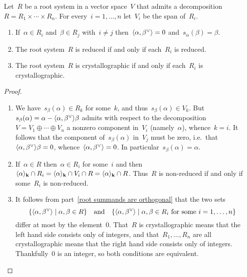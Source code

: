 \begin{proposition}
  \label{properties of decompositions}
  Let~$R$ be a root system in a vector space~$V$ that admits a decomposition~$R = R_1 \times \dotsb \times R_n$.
  For every~$i = 1, \dotsc, n$ let~$V_i$ be the span of~$R_i$.
  \begin{enumerate}
    \item
      \label{root summands are orthogonal}
      If~$\alpha \in R_i$ and~$\beta \in R_j$ with~$i \neq j$ then~$\pair{\alpha, \check{\beta}} = 0$ and~$s_\alpha(\beta) = \beta$.
    \item
      The root system~$R$ is reduced if and only if each~$R_i$ is reduced.
    \item
      The root system~$R$ is crystallographic if and only if each~$R_i$ is crystallographic.
  \end{enumerate}
\end{proposition}


\begin{proof}
  \leavevmode
  \begin{enumerate}
    \item
      We have~$s_\beta(\alpha) \in R_k$ for some~$k$, and thus~$s_\beta(\alpha) \in V_k$.
      But~$s_\beta(\alpha) = \alpha - \pair{\alpha, \check{\beta}} \beta$ admits with respect to the decomposition~$V = V_1 \oplus \dotsb \oplus V_n$ a nonzero component in~$V_i$ (namely~$\alpha$), whence~$k = i$.
      It follows that the component of~$s_\beta(\alpha)$ in~$V_j$ must be zero, i.e.\ that~$\pair{\alpha, \check{\beta}} \beta = 0$, whence~$\pair{\alpha, \check{\beta}} = 0$.
      In particular~$s_\beta(\alpha) = \alpha$.
    \item
      If~$\alpha \in R$ then~$\alpha \in R_i$ for some~$i$ and then~$\langle\alpha\rangle_{\mathbf{k}} \cap R_i = \langle\alpha\rangle_{\mathbf{k}} \cap V_i \cap R = \langle\alpha\rangle_{\mathbf{k}} \cap R$.
      Thus~$R$ is non-reduced if and only if some~$R_i$ is non-reduced.
    \item
      It follows from part~\ref*{root summands are orthogonal} that the two sets
      \[
        \{
          \pair{\alpha, \check{\beta}}
        \suchthat
          \alpha, \beta \in R
        \}
        \quad\text{and}\quad
        \{
          \pair{\alpha, \check{\beta}}
        \suchthat
          \text{$\alpha, \beta \in R_i$ for some~$i = 1, \dotsc, n$}
        \}
      \]
      differ at most by the element~$0$.
      That~$R$ is crystallographic means that the left hand side consists only of integers, and that~$R_1, \dotsc, R_n$ are all crystallographic means that the right hand side consists only of integers.
      Thankfully~$0$ is an integer, so both conditions are equivalent.
    \qedhere
  \end{enumerate}
\end{proof}


